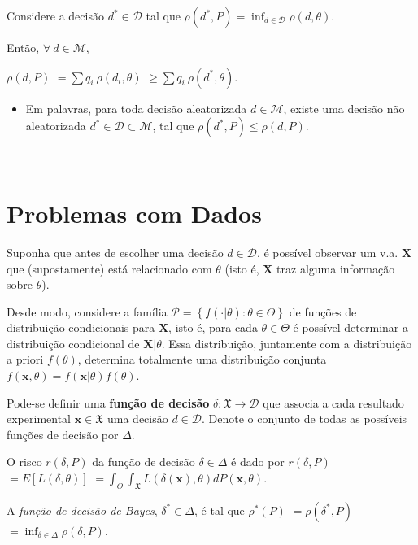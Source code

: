 \documentclass[
]{book}
\providecommand{\tightlist}{%
  \setlength{\itemsep}{0pt}\setlength{\parskip}{0pt}}
\begin{document}
Considere a decisão \({d}^* \in \mathcal{D}\) tal que \(\rho({d}^*,P) = \displaystyle \inf_{d \in \mathcal{D}} \rho(d,\theta)\).

Então, \(\forall ~d \in \mathcal{M}\),

\(\rho(d,P)\) \(=\displaystyle \sum q_i~ \rho(d_i,\theta)\) \(\geq \displaystyle \sum q_i~ \rho({d}^*,\theta)\).

\begin{itemize}
\tightlist
\item
  Em palavras, para toda decisão aleatorizada \(d\in\mathcal{M}\), existe uma decisão não aleatorizada \({d}^*\in\mathcal{D} \subset\mathcal{M}\), tal que \(\rho({d}^*,P) \leq \rho(d,P)\).
\end{itemize}

\(~\)

\hypertarget{problemas-com-dados}{%
\section{Problemas com Dados}\label{problemas-com-dados}}

Suponha que antes de escolher uma decisão \(d \in \mathcal{D}\), é possível observar um v.a. \(\boldsymbol X\) que (supostamente) está relacionado com \(\theta\) (isto é, \(\boldsymbol X\) traz alguma informação sobre \(\theta\)).

Desde modo, considere a família \(\mathcal{P}=\left\{ f(\cdot|\theta) : \theta \in \Theta\right\}\) de funções de distribuição condicionais para \(\boldsymbol X\), isto é, para cada \(\theta \in \Theta\) é possível determinar a distribuição condicional de \(\boldsymbol X|\theta\). Essa distribuição, juntamente com a distribuição a priori \(f(\theta)\), determina totalmente uma distribuição conjunta \(f(\boldsymbol x,\theta) = f(\boldsymbol x|\theta) f(\theta)\).

Pode-se definir uma \textbf{função de decisão} \(\delta: \mathfrak{X} \longrightarrow \mathcal{D}\) que associa a cada resultado experimental \(\boldsymbol x \in \mathfrak{X}\) uma decisão \(d \in \mathcal{D}\). Denote o conjunto de todas as possíveis funções de decisão por \(\Delta\).

O risco \(r(\delta,P)\) da função de decisão \(\delta \in \Delta\) é dado por \(r(\delta,P)\) \(=E\left[L\left(\delta,\theta\right)\right]\) \(=\displaystyle \int_\Theta \int_{\mathfrak{X}} L\left(\delta(\boldsymbol x),\theta\right) dP(\boldsymbol x,\theta)\).

A \emph{função de decisão de Bayes}, \({\delta}^* \in \Delta\), é tal que \({\rho}^*(P)\) \(=\rho({\delta}^*,P)\) \(=\displaystyle \inf_{\delta\in \Delta} \rho(\delta,P)\).
\end{document}
